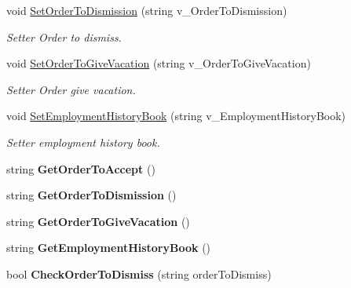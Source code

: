 \begin{DoxyCompactItemize}
\mbox{\label{class_documents_ae91e6dba2623a69fafd9b886093087d0}} 
void \hyperlink{class_documents_ae91e6dba2623a69fafd9b886093087d0}{Set\+Order\+To\+Dismission} (string v\+\_\+\+Order\+To\+Dismission)
\begin{DoxyCompactList}\small\item\em Setter Order to dismiss. \end{DoxyCompactList}\item 
\mbox{\label{class_documents_a484f3e195b0ab7383ef09278cd95907f}} 
void \hyperlink{class_documents_a484f3e195b0ab7383ef09278cd95907f}{Set\+Order\+To\+Give\+Vacation} (string v\+\_\+\+Order\+To\+Give\+Vacation)
\begin{DoxyCompactList}\small\item\em Setter Order give vacation. \end{DoxyCompactList}\item 
\mbox{\label{class_documents_a49f95590b3808cdada6632f702213bfa}} 
void \hyperlink{class_documents_a49f95590b3808cdada6632f702213bfa}{Set\+Employment\+History\+Book} (string v\+\_\+\+Employment\+History\+Book)
\begin{DoxyCompactList}\small\item\em Setter employment history book. \end{DoxyCompactList}\item 
\mbox{\label{class_documents_aac5573ba9b558530c669eccf178e3879}} 
string {\bfseries Get\+Order\+To\+Accept} ()
\item 
\mbox{\label{class_documents_a47d56daa1f7434c712707bec1c827ea2}} 
string {\bfseries Get\+Order\+To\+Dismission} ()
\item 
\mbox{\label{class_documents_ab13dc4fd233d75d6be5a39142ad99b13}} 
string {\bfseries Get\+Order\+To\+Give\+Vacation} ()
\item 
\mbox{\label{class_documents_a44b0e6798731de568258ff317c6700da}} 
string {\bfseries Get\+Employment\+History\+Book} ()
\item 
\mbox{\label{class_documents_a97d69eea71291c43d6c344c4efeb8fc6}} 
bool {\bfseries Check\+Order\+To\+Dismiss} (string order\+To\+Dismiss)
\end{DoxyCompactItemize}
